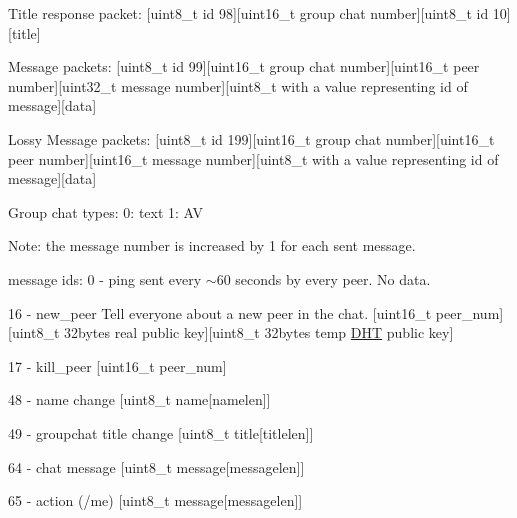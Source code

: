 Title response packet\+: \mbox{[}uint8\+\_\+t id 98\mbox{]}\mbox{[}uint16\+\_\+t group chat number\mbox{]}\mbox{[}uint8\+\_\+t id 10\mbox{]}\mbox{[}title\mbox{]}

Message packets\+: \mbox{[}uint8\+\_\+t id 99\mbox{]}\mbox{[}uint16\+\_\+t group chat number\mbox{]}\mbox{[}uint16\+\_\+t peer number\mbox{]}\mbox{[}uint32\+\_\+t message number\mbox{]}\mbox{[}uint8\+\_\+t with a value representing id of message\mbox{]}\mbox{[}data\mbox{]}

Lossy Message packets\+: \mbox{[}uint8\+\_\+t id 199\mbox{]}\mbox{[}uint16\+\_\+t group chat number\mbox{]}\mbox{[}uint16\+\_\+t peer number\mbox{]}\mbox{[}uint16\+\_\+t message number\mbox{]}\mbox{[}uint8\+\_\+t with a value representing id of message\mbox{]}\mbox{[}data\mbox{]}

Group chat types\+: 0\+: text 1\+: A\+V

Note\+: the message number is increased by 1 for each sent message.

message ids\+: 0 -\/ ping sent every $\sim$60 seconds by every peer. No data.

16 -\/ new\+\_\+peer Tell everyone about a new peer in the chat. \mbox{[}uint16\+\_\+t peer\+\_\+num\mbox{]}\mbox{[}uint8\+\_\+t 32bytes real public key\mbox{]}\mbox{[}uint8\+\_\+t 32bytes temp \hyperlink{struct_d_h_t}{D\+H\+T} public key\mbox{]}

17 -\/ kill\+\_\+peer \mbox{[}uint16\+\_\+t peer\+\_\+num\mbox{]}

48 -\/ name change \mbox{[}uint8\+\_\+t name\mbox{[}namelen\mbox{]}\mbox{]}

49 -\/ groupchat title change \mbox{[}uint8\+\_\+t title\mbox{[}titlelen\mbox{]}\mbox{]}

64 -\/ chat message \mbox{[}uint8\+\_\+t message\mbox{[}messagelen\mbox{]}\mbox{]}

65 -\/ action (/me) \mbox{[}uint8\+\_\+t message\mbox{[}messagelen\mbox{]}\mbox{]} 